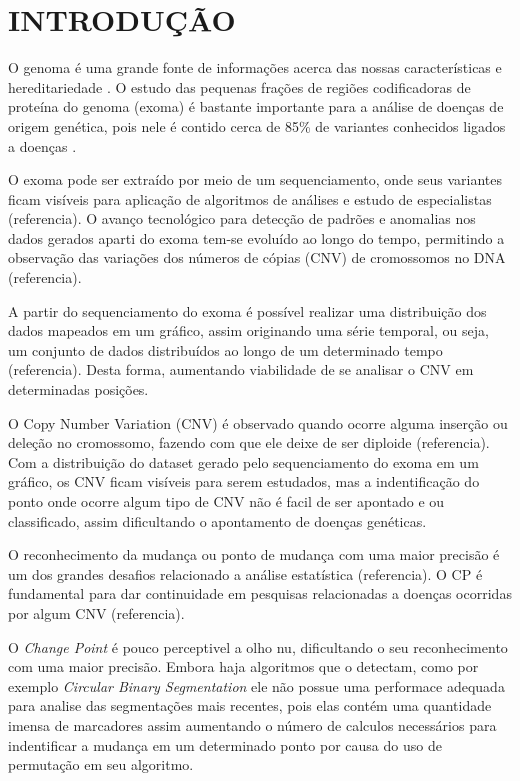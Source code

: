 
\chapter{INTRODUÇÃO}
\label{chap:introducao}


O genoma é uma grande fonte de informações acerca das nossas características e hereditariedade \cite{Correa2008}. O estudo das pequenas frações de regiões codificadoras de proteína do genoma (exoma) é bastante importante para a análise de doenças de origem genética, pois nele é contido cerca de 85\% de variantes conhecidos ligados a doenças \cite{Chong2015}.

O exoma pode ser extraído por meio de um sequenciamento, onde seus variantes ficam visíveis para aplicação de algoritmos de análises e estudo de especialistas (referencia). O avanço tecnológico para detecção de padrões e anomalias nos dados gerados aparti do exoma tem-se evoluído ao longo do tempo, permitindo a observação das variações dos números de cópias (CNV) de cromossomos no DNA (referencia).

A partir do sequenciamento do exoma é possível realizar uma distribuição dos dados mapeados em um gráfico, assim originando uma série temporal, ou seja, um conjunto de dados distribuídos ao longo de um determinado tempo (referencia). Desta forma, aumentando viabilidade de se analisar o CNV em determinadas posições.

O Copy Number Variation (CNV) é observado quando ocorre alguma inserção ou deleção no cromossomo, fazendo com que ele deixe de ser diploide (referencia). Com a distribuição do dataset gerado pelo sequenciamento do exoma em um gráfico, os CNV ficam visíveis para serem estudados, mas a indentificação do ponto onde ocorre algum tipo de CNV não é facil de ser apontado e ou classificado, assim dificultando o apontamento de doenças genéticas.

O reconhecimento da mudança ou ponto de mudança com uma maior precisão é um dos grandes desafios relacionado a análise estatística (referencia). O CP é fundamental para dar continuidade em pesquisas relacionadas a doenças ocorridas por algum CNV (referencia).

O \textit{Change Point} é pouco perceptivel a olho nu, dificultando o seu reconhecimento com uma maior precisão. Embora haja algoritmos que o detectam, como por exemplo \textit{Circular Binary Segmentation} ele não possue uma performace adequada para analise das segmentações mais recentes, pois elas contém uma quantidade imensa de marcadores assim aumentando o número de calculos necessários para indentificar a mudança em um determinado ponto por causa do uso de permutação em seu algoritmo.

